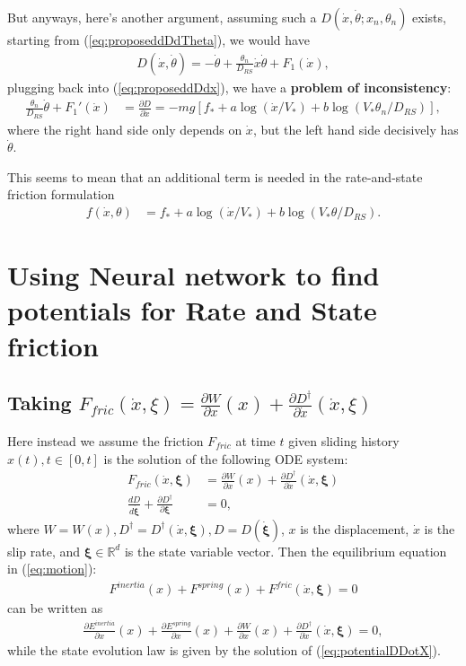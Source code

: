 But anyways, 
here's another argument, 
assuming such a $D(\dot{x}, \dot{\theta}; x_n, \theta_n)$ exists, 
starting from (\ref{eq:proposeddDdTheta}), 
we would have 
\begin{align}
    D(\dot{x}, \dot{\theta}) = -\dot{\theta} + \frac{\theta_n}{D_{RS}} \dot{x}\dot{\theta} + F_1(\dot{x}) \label{eq:DefF1}, 
\end{align}
plugging back into (\ref{eq:proposeddDdx}), 
we have a \textbf{problem of inconsistency}:
\begin{align}
    \frac{\theta_n}{D_{RS}} \dot{\theta} + F_1'(\dot{x}) &= \frac{\partial D}{\partial \dot{x}} = -mg\left[f_* + a\log(\dot{x}/V_*) + b \log(V_* \theta_n / D_{RS})\right] \label{eq:InconsProb}, 
\end{align}
where the right hand side only depends on $\dot{x}$, 
but the left hand side decisively has $\dot{\theta}$. 

This seems to mean that an additional term is needed in the rate-and-state friction formulation 
\begin{align*}
    f(\dot{x}, \theta) &= f_* + a\log(\dot{x}/V_*) + b\log(V_*\theta / D_{RS}). 
\end{align*}

\newpage
\section{Using Neural network to find potentials for Rate and State friction}
\subsection{Taking $F_{fric}(\dot{x}, \xi)=\frac{\partial W}{\partial x}(x) + \frac{\partial D^\dagger}{\partial \dot{x}}(\dot{x}, \xi)$}
Here instead we assume the friction $F_{fric}$ at time $t$ given sliding history $x(t), t \in [0, t]$ is the solution of the following ODE system:
\begin{align}
    F_{fric}(\dot{x}, \boldsymbol{\xi}) &= \frac{\partial W}{\partial x}(x) + \frac{\partial D^\dagger}{\partial \dot{x}}(\dot{x}, \bm{\xi}) \label{eq:potentialWDDotX}\\
    \frac{d D}{d \dot{\boldsymbol{\xi}}} + \frac{\partial D^\dagger}{\partial \boldsymbol{\xi}} &= 0 \label{eq:potentialDDotX}, 
\end{align}
where $W = W(x), D^\dagger = D^\dagger(\dot{x}, \boldsymbol{\xi}), D = D(\dot{\boldsymbol{\xi}})$, 
$x$ is the displacement, $\dot{x}$ is the slip rate, and 
$\bm{\xi} \in \mathbb{R}^d$ is the state variable vector. 
Then the equilibrium equation in (\ref{eq:motion}):
\begin{align*}
    F^{inertia}(x) + F^{spring}(x) + F^{fric}(\dot{x}, \bm{\xi}) = 0
\end{align*}
can be written as 
\begin{align}
    \frac{\partial E^{inertia}}{\partial x}(x) + \frac{\partial E^{spring}}{\partial x}(x) 
    + \frac{\partial W}{\partial x} (x) 
    + \frac{\partial D^\dagger}{\partial \dot{x}}(\dot{x}, \bm{\xi}) = 0 \label{eq:WDPotentialMotionDotX}, 
\end{align}
while the state evolution law is given by the solution of (\ref{eq:potentialDDotX}). 

